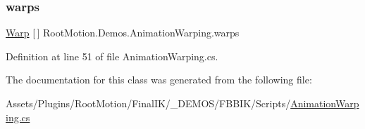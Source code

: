 \subsubsection{\texorpdfstring{warps}{warps}}
{\footnotesize\ttfamily \mbox{\hyperlink{struct_root_motion_1_1_demos_1_1_animation_warping_1_1_warp}{Warp}} \mbox{[}$\,$\mbox{]} Root\+Motion.\+Demos.\+Animation\+Warping.\+warps}



Definition at line 51 of file Animation\+Warping.\+cs.



The documentation for this class was generated from the following file\+:\begin{DoxyCompactItemize}
\item 
Assets/\+Plugins/\+Root\+Motion/\+Final\+I\+K/\+\_\+\+D\+E\+M\+O\+S/\+F\+B\+B\+I\+K/\+Scripts/\mbox{\hyperlink{_animation_warping_8cs}{Animation\+Warping.\+cs}}\end{DoxyCompactItemize}

